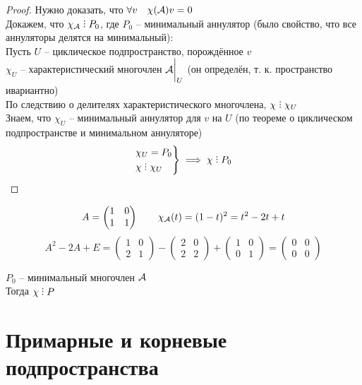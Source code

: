 \begin{proof}
	Нужно доказать, что $ \forall v \quad \chi(\mathcal{A})v = 0 $ \\
	Докажем, что $ \chi_{\mc{A}} \divby P_0 $, где $ P_0 $ -- минимальный аннулятор (было свойство, что все аннуляторы делятся на минимальный): \\
	Пусть $ U $ -- циклическое подпространство, порождённое $ v $ \\
	$ \chi_U $ -- характеристический многочлен $ \mathcal{A}\bigg|_{U}^{} $ (он определён, т. к. пространство ивариантно) \\
	По следствию о делителях характеристического многочлена, $ \chi \divby \chi_U $ \\
	Знаем, что $ \chi_U $ -- минимальный аннулятор для $ v $ на $ U $ (по теореме о циклическом подпространстве и минимальном аннуляторе)
	$$
	\begin{rcases}
		\chi_U = P_0 \\
		\chi \divby \chi_U
	\end{rcases} \implies \chi \divby P_0 $$
\end{proof}

\begin{eg}
	$$ A =
	\begin{pmatrix}
		1 & 0 \\
		1 & 1
	\end{pmatrix} \qquad \chi_{\mathcal{A}}(t) = (1 - t)^2 = t^2 - 2t + t $$
	$$ A^2 - 2A + E =
	\begin{pmatrix}
		1 & 0 \\
		2 & 1
	\end{pmatrix} -
	\begin{pmatrix}
		2 & 0 \\
		2 & 2
	\end{pmatrix} +
	\begin{pmatrix}
		1 & 0 \\
		0 & 1
	\end{pmatrix} =
	\begin{pmatrix}
		0 & 0 \\
		0 & 0
	\end{pmatrix} $$
\end{eg}

\begin{implication}
	$ P_0 $ -- минимальный многочлен $ \mathcal{A} $ \\
	Тогда $ \chi \divby P $
\end{implication}

\section{Примарные и корневые подпространства}

